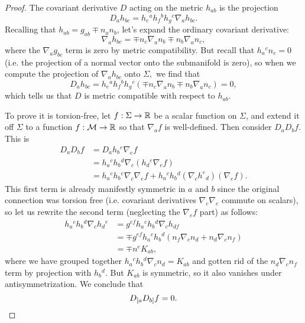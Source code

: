 \begin{proof}
    The covariant derivative $D$ acting on the metric $h_{ab}$ is the projection
    \begin{equation}
        D_a h_{bc}=h_e{}^a h_f{}^b h_g{}^c \nabla_a h_{bc}.
    \end{equation}
    Recalling that $h_{ab}=g_{ab}\mp n_a n_b$, let's expand the ordinary covariant derivative:
    \begin{equation}
        \nabla_a h_{bc}=\mp n_c \nabla_a n_b \mp n_b \nabla_a n_c,
    \end{equation}
    where the $\nabla_a g_{bc}$ term is zero by metric compatibility.
    But recall that $h_a{}^c n_c =0$ (i.e. the projection of a normal vector onto the submanifold is zero), so when we compute the projection of $\nabla_a h_{bc}$ onto $\Sigma,$ we find that
    \begin{equation}
        D_a h_{bc}=h_e{}^a h_f{}^b h_g{}^c(\mp n_c \nabla_a n_b \mp n_b \nabla_a n_c)=0,
    \end{equation}
    which tells us that $D$ is metric compatible with respect to $h_{ab}$.
    
    To prove it is torsion-free, let $f:\Sigma \to \mathbb{R}$ be a scalar function on $\Sigma$, and extend it off $\Sigma$ to a function $f:\mathcal{M} \to \mathbb{R}$ so that $\nabla_a f$ is well-defined. Then consider $D_a D_b f$. This is
    \begin{align*}
        D_a D_b f &= D_a h_b{}^e \nabla_e f\\
        &= h_a{}^c h_b{}^d \nabla_c(h_d{}^e \nabla_e f)\\
        &= h_a{}^c h_b{}^e \nabla_c \nabla_e f + h_a{}^c h_b{}^d (\nabla_c h^e{}_d) (\nabla_e f).
    \end{align*}
    This first term is already manifestly symmetric in $a$ and $b$ since the original connection was torsion free (i.e. covariant derivatives $\nabla_c\nabla_e$ commute on scalars), so let us rewrite the second term (neglecting the $\nabla_e f$ part) as follows:
    \begin{align*}
        h_a{}^c h_b{}^d \nabla_c h_d{}^e 
            &= g^{ef} h_a{}^c h_b{}^d \nabla_c h_{df}\\
            &= \mp g^{ef}h_a{}^c h_b{}^d (n_f \nabla_c n_d+ n_d \nabla_c n_f)\\
            &= \mp n^e K_{ab},
    \end{align*}
    where we have grouped together $h_a{}^c h_b{}^d \nabla_c n_d =K_{ab}$ and gotten rid of the $n_d \nabla_c n_f$ term by projection with $h_b{}^d$. But $K_{ab}$ is symmetric, so it also vanishes under antisymmetrization. We conclude that
    \begin{equation}
        D_{[a}D_{b]} f=0.\qedhere
    \end{equation}
\end{proof}

